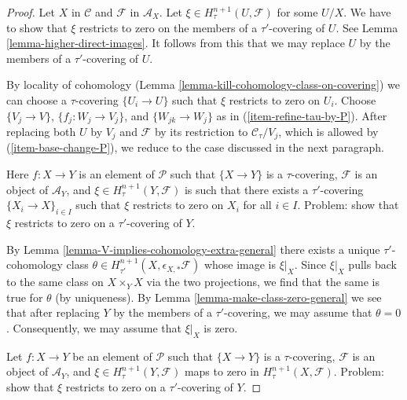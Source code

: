 \begin{proof}
Let $X$ in $\mathcal{C}$ and $\mathcal{F}$ in $\mathcal{A}_X$.
Let $\xi \in H^{n + 1}_\tau(U, \mathcal{F})$ for some $U/X$.
We have to show that $\xi$ restricts to zero on the members of
a $\tau'$-covering of $U$. See
Lemma \ref{lemma-higher-direct-images}.
It follows from this that we may
replace $U$ by the members of a $\tau'$-covering of $U$.

\medskip\noindent
By locality of cohomology
(Lemma \ref{lemma-kill-cohomology-class-on-covering})
we can choose a $\tau$-covering $\{U_i \to U\}$
such that $\xi$ restricts to zero on $U_i$.
Choose $\{V_j \to V\}$, $\{f_j : W_j \to V_j\}$, and
$\{W_{jk} \to W_j\}$ as in (\ref{item-refine-tau-by-P}).
After replacing both $U$ by $V_j$
and $\mathcal{F}$ by its restriction to
$\mathcal{C}_\tau/V_j$, which is allowed by
(\ref{item-base-change-P}), we reduce to the
case discussed in the next paragraph.

\medskip\noindent
Here $f : X \to Y$ is an element of $\mathcal{P}$
such that $\{X \to Y\}$ is a $\tau$-covering,
$\mathcal{F}$ is an object of $\mathcal{A}_Y$, and
$\xi \in H^{n + 1}_\tau(Y, \mathcal{F})$ is such that
there exists a $\tau'$-covering $\{X_i \to X\}_{i \in I}$
such that $\xi$ restricts to zero on $X_i$ for all $i \in I$.
Problem: show that $\xi$ restricts to zero on a $\tau'$-covering of $Y$.

\medskip\noindent
By Lemma \ref{lemma-V-implies-cohomology-extra-general} there exists a
unique $\tau'$-cohomology class
$\theta \in H^{n + 1}_{\tau'}(X, \epsilon_{X, *}\mathcal{F})$
whose image is $\xi|_X$.
Since $\xi|_X$ pulls back to the same class on $X \times_Y X$
via the two projections, we find that the same is true for $\theta$
(by uniqueness).
By Lemma \ref{lemma-make-class-zero-general}
we see that after replacing $Y$ by the members of a $\tau'$-covering,
we may assume that $\theta = 0$.
Consequently, we may assume that $\xi|_X$ is zero.

\medskip\noindent
Let $f : X \to Y$ be an element of $\mathcal{P}$
such that $\{X \to Y\}$ is a $\tau$-covering,
$\mathcal{F}$ is an object of $\mathcal{A}_Y$, and
$\xi \in H^{n + 1}_\tau(Y, \mathcal{F})$
maps to zero in $H^{n + 1}_\tau(X, \mathcal{F})$.
Problem: show that $\xi$ restricts to zero on a $\tau'$-covering of $Y$.


\end{proof}
